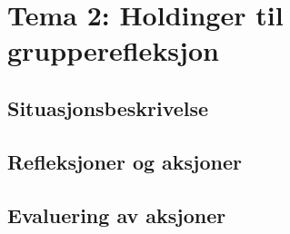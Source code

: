 \chapter{Tema 2: Holdinger til grupperefleksjon}

\section{Situasjonsbeskrivelse}
\section{Refleksjoner og aksjoner}
\section{Evaluering av aksjoner}